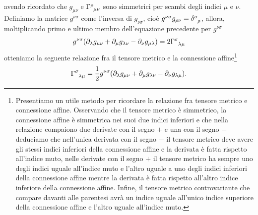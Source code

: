 avendo ricordato che $g_{\mu\nu}$ e $\tensor{\Gamma}{^{\rho}_{\mu\nu}}$ sono
simmetrici per scambi degli indici $\mu$ e $\nu$.  Definiamo la matrice
$g^{\nu\sigma}$ come l'inversa di $g_{\nu\sigma}$, cioè
$g^{\nu\sigma}g_{\rho\nu} = \tensor{\delta}{^{\sigma}_{\rho}}$, allora,
moltiplicando primo e ultimo membro dell'equazione precedente per
$g^{\nu\sigma}$
\begin{equation}
  g^{\nu\sigma}(\partial_{\lambda}g_{\mu\nu} + \partial_{\mu}g_{\lambda\nu}
  - \partial_{\nu}g_{\mu\lambda}) = 2\tensor{\Gamma}{^{\sigma}_{\lambda\mu}}
\end{equation}
otteniamo la seguente relazione fra il tensore metrico e
la connessione
affine\footnote{Presentiamo un utile metodo per ricordare la relazione fra
  tensore metrico e connessione affine.  Osservando che il tensore metrico è
  simmetrico, la connessione affine è simmetrica nei suoi due indici inferiori e
  che nella relazione compaiono due derivate con il segno $+$ e una con il segno
  $-$ deduciamo che nell'unica derivata con il segno $-$ il tensore metrico deve
  avere gli stessi indici inferiori della connessione affine e la derivata è
  fatta rispetto all'indice muto, nelle derivate con il segno $+$ il tensore
  metrico ha sempre uno degli indici uguale all'indice muto e l'altro uguale a
  uno degli indici inferiori della connessione affine mentre la derivata è fatta
  rispetto all'altro indice inferiore della connessione affine.  Infine, il
  tensore metrico controvariante che compare davanti alle parentesi avrà un
  indice uguale all'unico indice superiore della connessione affine e l'altro
  uguale all'indice muto.}
\begin{equation}
  \label{eq:connessione-metrica}
  \tensor{\Gamma}{^{\sigma}_{\lambda\mu}} =
  \frac{1}{2} g^{\nu\sigma} (\partial_{\lambda}g_{\mu\nu}
  + \partial_{\mu}g_{\lambda\nu} - \partial_{\nu}g_{\lambda\mu}).
\end{equation}

